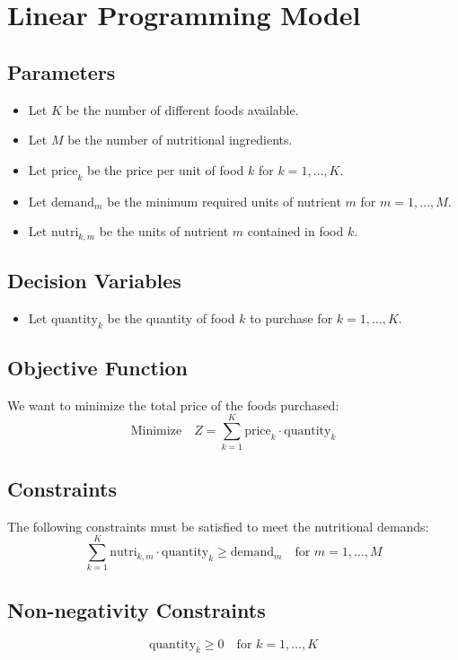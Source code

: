 \documentclass{article}
\begin{document}
\section*{Linear Programming Model}

\subsection*{Parameters}
\begin{itemize}
    \item Let \( K \) be the number of different foods available.
    \item Let \( M \) be the number of nutritional ingredients.
    \item Let \( \text{price}_k \) be the price per unit of food \( k \) for \( k = 1, \ldots, K \).
    \item Let \( \text{demand}_m \) be the minimum required units of nutrient \( m \) for \( m = 1, \ldots, M \).
    \item Let \( \text{nutri}_{k,m} \) be the units of nutrient \( m \) contained in food \( k \).
\end{itemize}

\subsection*{Decision Variables}
\begin{itemize}
    \item Let \( \text{quantity}_k \) be the quantity of food \( k \) to purchase for \( k = 1, \ldots, K \).
\end{itemize}

\subsection*{Objective Function}
We want to minimize the total price of the foods purchased:
\[
\text{Minimize} \quad Z = \sum_{k=1}^{K} \text{price}_k \cdot \text{quantity}_k
\]

\subsection*{Constraints}
The following constraints must be satisfied to meet the nutritional demands:
\[
\sum_{k=1}^{K} \text{nutri}_{k,m} \cdot \text{quantity}_k \geq \text{demand}_m \quad \text{for } m = 1, \ldots, M
\]

\subsection*{Non-negativity Constraints}
\[
\text{quantity}_k \geq 0 \quad \text{for } k = 1, \ldots, K
\]
\end{document}
